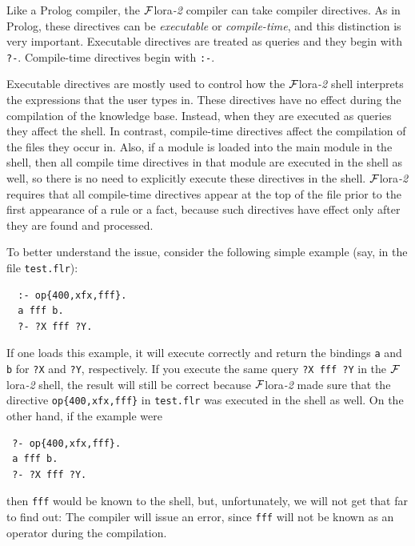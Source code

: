 \documentclass[11pt]{article}
\newcommand{\FLORA}{{\mbox{\sc ${\cal F}${lora}\rm\emph{-2}}}\xspace}
\newcommand{\FLSYSTEM}{\FLORA}
\newcommand{\flrext}{flr\xspace}
\begin{document}
Like a Prolog compiler, the \FLSYSTEM compiler can take compiler directives.
As in Prolog, these directives can be \emph{executable} or
\emph{compile-time}, and this distinction is very important.
Executable directives are treated as queries and they begin with {\tt ?-}.
Compile-time directives begin with {\tt :-}.

Executable directives are mostly used to control how the \FLSYSTEM shell
interprets the expressions that the user types in. These directives have no
effect during the compilation of the knowledge base. Instead, when they are
executed as queries they affect the shell. In contrast, compile-time
directives affect the compilation of the files they occur in. Also, if a
module is loaded into the main module in the shell, then all compile time
directives in that module are executed in the shell as well, so there is no
need to explicitly execute these directives in the shell.
\FLSYSTEM requires
that all compile-time directives appear at the top of the file prior to
the first appearance of a rule or a fact, because such directives have
effect only after they are found and processed.

To better understand the issue, consider the following simple example
(say, in the file {\tt test.\flrext}):
\begin{verbatim}
  :- op{400,xfx,fff}.
  a fff b.
  ?- ?X fff ?Y.
\end{verbatim}
If one loads this example, it will execute correctly and return the
bindings {\tt a} and {\tt b} for {\tt ?X} and {\tt ?Y}, respectively.
If you execute the same query {\tt ?X fff ?Y} in the \FLSYSTEM shell,
the result will still be correct because \FLSYSTEM made sure that the
directive {\tt op\{400,xfx,fff\}} in
{\tt test.\flrext} was executed in the shell as well.
On the other hand, if the example were
\begin{verbatim}
 ?- op{400,xfx,fff}.
 a fff b.
 ?- ?X fff ?Y.
\end{verbatim}
then {\tt fff} would be known to the shell, but, unfortunately, we
will not get that far to find out: The compiler will issue an error, since
{\tt fff} will not be known as an operator during the compilation.
\end{document}
